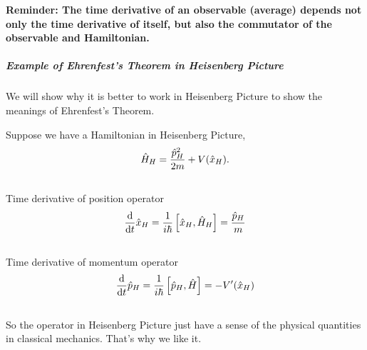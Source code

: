 \documentclass[letterpaper,10pt,english]{sphinxmanual}
\begin{document}
\textbf{Reminder: The time derivative of an observable (average) depends not only the time derivative of itself, but also the commutator of the observable and Hamiltonian.}


\subparagraph{Example of Ehrenfest's Theorem in Heisenberg Picture}
\label{QuantumMechanics:example-of-ehrenfest-s-theorem-in-heisenberg-picture}
We will show why it is better to work in Heisenberg Picture to show the meanings of Ehrenfest's Theorem.

Suppose we have a Hamiltonian in Heisenberg Picture,
\begin{gather}
\begin{split}\hat H_H = \frac{\hat p _ H^2 }{2m} + V(\hat x _ H) .\end{split}\notag\\\begin{split}\end{split}\notag
\end{gather}
Time derivative of position operator
\begin{gather}
\begin{split}\frac{\mathrm{d}}{\mathrm{d} t} \hat x _ H = \frac{1}{i\hbar} \left[\hat x _ H, \hat H _ H \right ] = \frac{\hat p _ H}{m}\end{split}\notag\\\begin{split}\end{split}\notag
\end{gather}
Time derivative of momentum operator
\begin{gather}
\begin{split}\frac{\mathrm{d}}{\mathrm{d} t} \hat p_H = \frac{1}{i\hbar } \left[ \hat p _ H, \hat H \right] = - V'(\hat x_H)\end{split}\notag\\\begin{split}\end{split}\notag
\end{gather}
So the operator in Heisenberg Picture just have a sense of the physical quantities in classical mechanics. That's why we like it.
\end{document}
